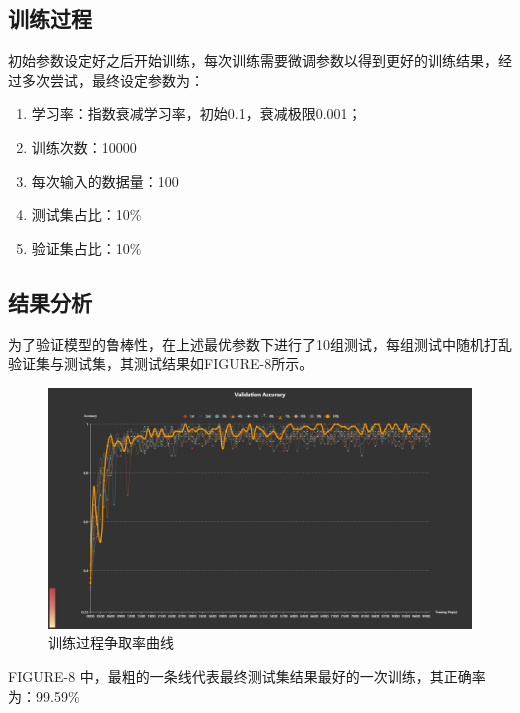 \documentclass{ctexart}
\begin{document}
\subsection{训练过程}
初始参数设定好之后开始训练，每次训练需要微调参数以得到更好的训练结果，经过多次尝试，最终设定参数为：
\begin{enumerate}
\item 学习率：指数衰减学习率，初始0.1，衰减极限0.001；
\item 训练次数：10000
\item 每次输入的数据量：100
\item 测试集占比：10\%
\item 验证集占比：10\%
\end{enumerate}

\subsection{结果分析}
为了验证模型的鲁棒性，在上述最优参数下进行了10组测试，每组测试中随机打乱验证集与测试集，其测试结果如FIGURE-8所示。
\begin{figure}[!htbp] 
\centering
\includegraphics[width=\linewidth]{img/VA.png} 
\caption{训练过程争取率曲线}
\label{f8} 
\end{figure}

FIGURE-8 中，最粗的一条线代表最终测试集结果最好的一次训练，其正确率为：99.59\%
\end{document}
